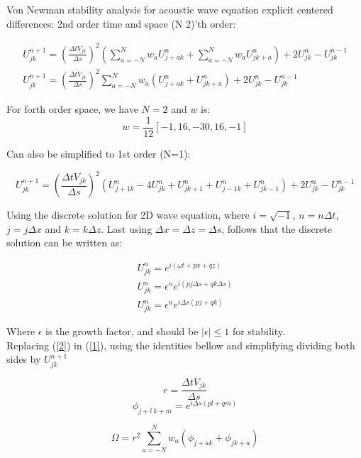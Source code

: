 \documentclass[legalpaper, 12pt]{article}
\begin{document}
Von Newman stability analysis for acoustic wave equation explicit centered differences: 2nd order time and space (N 2)'th order:


\begin{multline}
U_{jk}^{n+1}  =  \left( \frac{\Delta t  V_{jk} }{\Delta s} \right) ^2 \left(  \sum_{a=-N}^N w_a U_{j+a k}^n + \sum_{a=-N}^N w_a U_{j k+a}^n \right) + 2 U_{jk}^{n} - U_{jk}^{n-1}  \\
U_{jk}^{n+1}  =  \left( \frac{\Delta t  V_{jk}}{\Delta s} \right) ^2  \sum_{a=-N}^N  w_a \left( U_{j+a k}^n + U_{j k+a}^n \right) + 2 U_{jk}^{n} - U_{jk}^{n-1} \label{1}
\end{multline}

For forth order space, we have $N=2$ and $w$ is:
$$ w = \frac{1}{12} [-1, 16, -30, 16, -1] $$

Can also be simplified to 1st order (N=1):

\begin{equation}
U_{jk}^{n+1}  =  \left( \frac{\Delta t  V_{jk}}{\Delta s} \right) ^2 \left(  U_{j+1k}^n - 4 U_{jk}^n + U_{jk+1}^n + U_{j-1k}^n + U_{jk-1}^n  \right) + 2 U_{jk}^{n} - U_{jk}^{n-1} \nonumber
\end{equation}


Using the discrete solution for 2D wave equation, where $ i = \sqrt{-1} $, $ n = n \Delta t $, $ j = j \Delta x $ and $ k = k \Delta z $. Last using $ \Delta x = \Delta z = \Delta s $, follows that the discrete solution can be written as:

\begin{eqnarray}
U_{jk}^n = e^{i \left( \omega t + px + qz \right)} \nonumber \\
U_{jk}^n = \epsilon^n e^{i \left( pj\Delta s + qk\Delta s \right)}  \nonumber \\
U_{jk}^n = \epsilon^n e^{i \Delta s \left( pj + qk \right)}  \label{2}
\end{eqnarray}

Where $\epsilon $ is the growth factor, and should be $ |\epsilon| \leq 1$ for stability. \\

Replacing (\ref{2}) in (\ref{1}), using the identities bellow and simplifying dividing both sides by $ U_{jk}^{n+1} $

$$ r = \frac{\Delta t  V_{jk}}{\Delta s} $$
$$ \phi_{j+l\ k+m} = e^{i \Delta s \left( pl+qm \right)} $$

\begin{equation}
\Omega = r^2 \sum_{a=-N}^N  w_a \left( \phi_{j+a k} + \phi_{j k+a}  \right) \label{3}
\end{equation}
\end{document}
